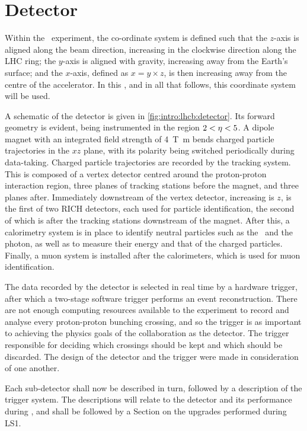 \section{Detector}
\label{chap:intro:lhcb:detector}

Within the \lhcb\ experiment, the co-ordinate system is defined such that the 
$z$-axis is aligned along the beam direction, increasing in the clockwise 
direction along the \ac{LHC} ring; the $y$-axis is aligned with gravity, 
increasing away from the Earth's surface; and the $x$-axis, defined as $x = y 
\times z$, is then increasing away from the centre of the accelerator.
In this , and in all that follows, this 
coordinate system will be used.

A schematic of the detector is given in \cref{fig:intro:lhcb:detector}.
Its forward geometry is evident, being instrumented in the region $2 < \eta < 
5$.
A dipole magnet with an integrated field strength of \SI{4}{\tesla\metre} bends 
charged particle trajectories in the $xz$ plane, with its polarity being 
switched periodically during data-taking.
Charged particle trajectories are recorded by the tracking system.
This is composed of a vertex detector centred around the proton-proton 
interaction region, three planes of tracking stations before the magnet, and 
three planes after.
Immediately downstream of the vertex detector, increasing is $z$, is the first 
of two \ac{RICH} detectors, each used for particle identification, the second 
of which is after the tracking stations downstream of the magnet.
After this, a calorimetry system is in place to identify neutral particles such 
as the \Ppizero\ and the photon, as well as to measure their energy and that of 
the charged particles.
Finally, a muon system is installed after the calorimeters, which is used for 
muon identification.

The data recorded by the detector is selected in real time by a hardware 
trigger, after which a two-stage software trigger performs an event 
reconstruction.
There are not enough computing resources available to the experiment to record 
and analyse every proton-proton bunching crossing, and so the trigger is as 
important to achieving the physics goals of the collaboration as the detector.
The trigger responsible for deciding which crossings should be kept and which 
should be discarded.
The design of the detector and the trigger were made in consideration of one 
another.

Each sub-detector shall now be described in turn, followed by a description of 
the trigger system.
The descriptions will relate to the detector and its performance during 
\runone, and shall be followed by a Section on the upgrades performed during 
\ac{LS1}.

